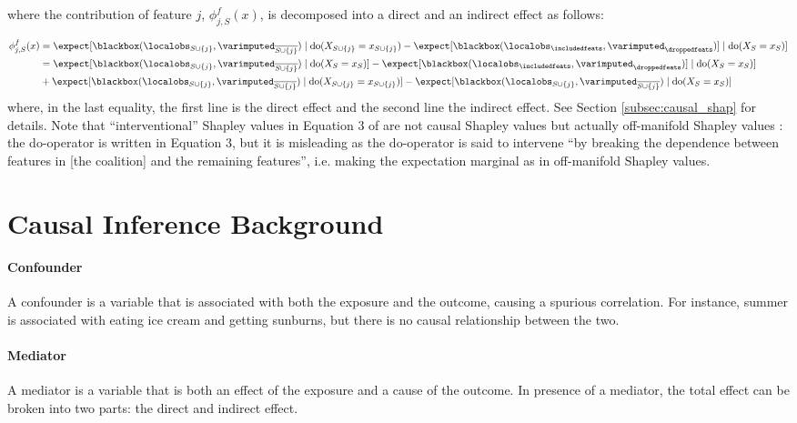 \documentclass{article}
\theoremstyle{plain}
\theoremstyle{definition}
\theoremstyle{remark}
\theoremstyle{mystyle}
\newcommand{\coalitionshapley}[4]{\phi^{#1}_{#3,#2}(#4)}
\begin{document}
where the contribution of feature $j$, $\coalitionshapley{f}{S}{j}{x}$,  is decomposed into a direct and an indirect effect as follows:

\begin{align*}
\coalitionshapley{f}{S}{j}{x}
    &=  \expect[\blackbox({\localobs_{S \cup \{j\}}, \varimputed_{\overline{S \cup \{j\}}}}) \mid \text{do}(X_{S \cup \{j\}}=x_{S \cup \{j\}}) - \expect[\blackbox({\localobs_{\includedfeats}, \varimputed_{\droppedfeats}})]\mid \text{do}(X_{S}=x_{S})] \\
    &=  \expect[\blackbox({\localobs_{S \cup \{j\}}, \varimputed_{\overline{S \cup \{j\}}}}) \mid \text{do}(X_{S}=x_{S})] - \expect[\blackbox({\localobs_{\includedfeats}, \varimputed_{\droppedfeats}})]\mid \text{do}(X_{S}=x_{S})] \\
&+   \expect[\blackbox({\localobs_{S \cup \{j\}}, \varimputed_{\overline{S \cup \{j\}}}}) \mid \text{do}(X_{S \cup \{j\}}=x_{S \cup \{j\}})] - \expect[\blackbox({\localobs_{S \cup \{j\}}, \varimputed_{\overline{S \cup \{j\}}}}) \mid \text{do}(X_{S}=x_{S})]  
\end{align*}
where, in the last equality, the first line is the direct effect and the second line the indirect effect. See Section \ref{subsec:causal_shap} for details. Note that ``interventional'' Shapley values in Equation 3 of  are not causal Shapley values but actually off-manifold Shapley values : the do-operator is written in Equation 3, but it is misleading as the do-operator is said to intervene ``by breaking the dependence between features in [the coalition] and the remaining features'', i.e. making the expectation marginal as in off-manifold Shapley values.


\section{Causal Inference Background}
\label{sec:ci}

\paragraph{Confounder}{A confounder is a variable that is associated with both the exposure and the outcome, causing a spurious correlation. For instance, summer is associated with eating ice cream and getting sunburns, but there is no causal relationship between the two.}
\paragraph{Mediator}{A mediator is a variable that is both an effect of the exposure and a cause of the outcome. In presence of a mediator, the total effect can be broken into two parts: the direct and indirect effect.}
\end{document}
